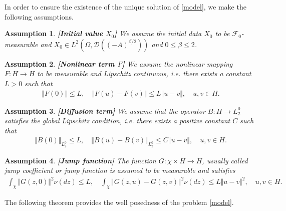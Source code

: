 \documentclass[review,12pt]{elsarticle}
\newtheorem{Assumption}{Assumption}[section]
\begin{document}
In order to ensure the existence of the unique solution of \eqref{model}, we make the following assumptions.
\begin{Assumption}\textbf{[Initial value $X_0$]}
\label{assumption1}
We assume the initial data $X_0$ to be $\mathcal{F}_0$-measurable and  $X_0\in L^2\left(\Omega, \mathcal{D}\left((-A)^{\beta/2}\right)\right)$ and $0\leq\beta\leq 2$.
\end{Assumption}
\begin{Assumption}\textbf{[Nonlinear term $F$]}
\label{assumption2} 
We assume  the nonlinear mapping  $F: H\longrightarrow H$ to be  measurable and Lipschitz continuous, i.e. there exists a constant  $L>0$ such that 
\begin{eqnarray}
\label{reviewinequal1}
\Vert F(0)\Vert\leq L,\quad \Vert F(u)-F(v)\Vert \leq L\Vert u-v\Vert, \quad u,v\in H.
\end{eqnarray}
\end{Assumption}
 \begin{Assumption}\textbf{[Diffusion term]} 
 \label{assumption3}
  We assume that the operator  $B : H \longrightarrow L^0_2$ satisfies the global Lipschitz condition, i.e. there exists a positive constant $C$ such that 
 \begin{eqnarray}
 \Vert B(0)\Vert_{L^0_2}\leq L,\quad \Vert B(u)-B(v)\Vert_{L_2^0}\leq C\Vert u-v\Vert, \quad u,v\in H.
 \end{eqnarray}
 \end{Assumption}
 \begin{Assumption}\textbf{[Jump function]}
 \label{assumption4}
 The function $G: \chi\times H\longrightarrow H$, usually called jump coefficient or jump function is assumed to be measurable and satisfies
 \begin{eqnarray}
 \int_{\chi}\Vert G(z,0)\Vert^2\nu(dz)\leq L,\quad \int_{\chi}\Vert G(z, u)-G(z, v)\Vert^2\nu(dz)\leq L\Vert u-v\Vert^2,\quad u, v\in H.
 \end{eqnarray}
\end{Assumption}
The following theorem provides the well posedness of the problem \eqref{model}.
\end{document}
